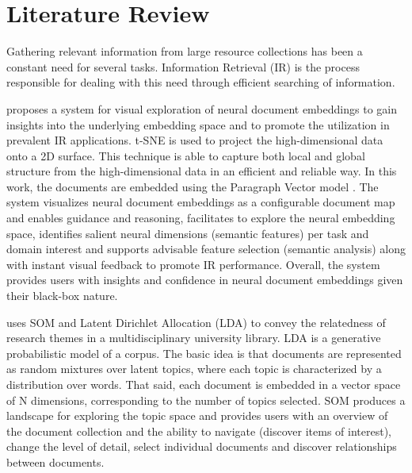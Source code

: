 \documentclass[a4paper]{article}
\begin{document}
\section*{Literature Review}
Gathering relevant information from large resource collections has been a constant need for several tasks. Information Retrieval (IR) is the process responsible for dealing with this need through efficient searching of information.

\citet{Ji2019} proposes a system for visual exploration of neural document embeddings to gain insights into the underlying embedding space and to promote the utilization in prevalent IR applications. t-SNE \citep{Van2008} is used to project the high-dimensional data onto a 2D surface. This technique is able to capture both local and global structure from the high-dimensional data in an efficient and reliable way. In this work, the documents are embedded using the Paragraph Vector model \citep{Le2014}. The system visualizes neural document embeddings as a configurable document map and enables guidance and reasoning, facilitates to explore the neural embedding space, identifies salient neural dimensions (semantic features) per task and domain interest and supports advisable feature selection (semantic analysis) along with instant visual feedback to promote IR performance. Overall, the system provides users with insights and confidence in neural document embeddings given their black-box nature.

\citet{Lafia2019} uses SOM and Latent Dirichlet Allocation (LDA) \citep{Blei2003} to convey the relatedness of research themes in a multidisciplinary university library. LDA is a generative probabilistic model of a corpus. The basic idea is that documents are represented as random mixtures over latent topics, where each topic is characterized by a distribution over words. That said, each document is embedded in a vector space of N dimensions, corresponding to the number of topics selected. SOM produces a landscape for exploring the topic space and provides users with an overview of the document collection and the ability to navigate (discover items of interest), change the level of detail, select individual documents and discover relationships between documents.
\end{document}
